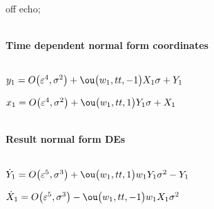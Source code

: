 \documentclass[11pt,a5paper]{article}
\begin{document}


off echo;


\(\)
\paragraph{Time dependent normal form coordinates}
\(
\)\par

\(y_{1}=O\big(\varepsilon ^{4},\sigma^{2}\big)+\ou\big(w_{1},tt,-1\big) X_
{1} \sigma +Y_{1}
\)\par

\(x_{1}=O\big(\varepsilon ^{4},\sigma^{2}\big)+\ou\big(w_{1},tt,1\big) Y_{
1} \sigma +X_{1}
\)\par

\(\)
\paragraph{Result normal form DEs}
\(
\)\par

\(\dot Y_{1}=O\big(\varepsilon ^{5},\sigma^{3}\big)+\ou\big(w_{1},tt,1
\big) w_{1} Y_{1} \sigma ^{2}-Y_{1}
\)\par

\(\dot X_{1}=O\big(\varepsilon ^{5},\sigma^{3}\big)-\ou\big(w_{1},tt,-1
\big) w_{1} X_{1} \sigma ^{2}
\)\par
\end{document}
